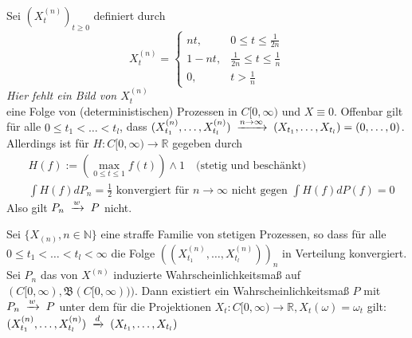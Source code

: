 \documentclass[a4paper,twoside,DIV15,BCOR12mm]{scrbook}
\newcommand{\borel}{{\mathfrak B}}
\begin{document}
\begin{beispiel}
  Sei $(X_t^{(n)})_{t\geq0}$ definiert durch
\[
X_t^{(n)}=
\begin{cases}
nt, & 0\leq t\leq \frac{1}{2n} \\
1-nt, & \frac{1}{2n}\leq t\leq\frac{1}{n} \\
0, & t>\frac{1}{n}
\end{cases}
\]
\emph{Hier fehlt ein Bild von $X_t^{(n)}$} \\
eine Folge von (deterministischen) Prozessen in $C[0,\infty)$ und $X\equiv 0$. Offenbar gilt für alle $0\leq t_1<\dots<t_l$, dass $(X_{t_1}^{(n)},\dots,X_{t_l}^{(n)})\tomit{n\to\infty}(X_{t_1},\dots,X_{t_l})=(0,\dots,0)$. \\
Allerdings ist für $H:C[0,\infty)\longrightarrow\mathbb R$ gegeben durch 
  \begin{align*}
  & H(f):=\left(\max_{0\leq t\leq1}f(t)\right)\wedge1\quad \text{(stetig und beschänkt)} \\
 & \int H(f)dP_n=\frac{1}{2}\text{ konvergiert für $n\to\infty$ nicht gegen } \int H(f)dP(f)=0
  \end{align*}
Also gilt $P_n\tomit{w}P$ nicht.
\end{beispiel}
\begin{satz}
  \label{satz:14.3}
Sei $\{X_{(n)},n\in\mathbb N\}$ eine straffe Familie von stetigen Prozessen, so dass für alle $0\leq t_1<\dots<t_l<\infty$ die Folge $((X_{t_1}^{(n)},\dots,X_{t_l}^{(n)}))_n$ in Verteilung konvergiert. Sei $P_n$ das von $X^{(n)}$ induzierte Wahrscheinlichkeitsmaß auf $(C[0,\infty),\borel(C[0,\infty)))$. Dann existiert ein Wahrscheinlichkeitsmaß $P$ mit $P_n\tomit{w}P$ unter dem für die Projektionen $X_t:C[0,\infty)\longrightarrow\mathbb R,X_t(\omega)=\omega_t$ gilt: $(X_{t_1}^{(n)},\dots,X_{t_l}^{(n)})\tomit{d}(X_{t_1},\dots,X_{t_l})$
\end{satz}
\end{document}
